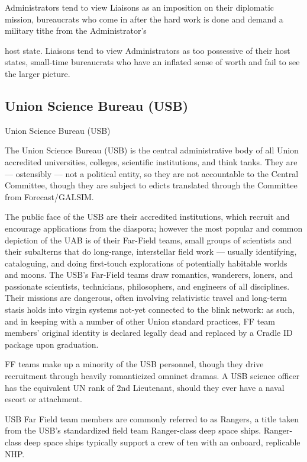 Administrators tend to view Liaisons as an imposition on their diplomatic mission, bureaucrats
who come in after the hard work is done and demand a military tithe from the Administrator’s




host state. Liaisons tend to view Administrators as too possessive of their host states, small-time
bureaucrats who have an inflated sense of worth and fail to see the larger picture.


\subsection{Union Science Bureau (USB)}

Union Science Bureau (USB)

The Union Science Bureau (USB) is the central administrative body of all Union accredited
universities, colleges, scientific institutions, and think tanks. They are — ostensibly — not a
political entity, so they are not accountable to the Central Committee, though they are subject to
edicts translated through the Committee from Forecast/GALSIM.


The public face of the USB are their accredited institutions, which recruit and encourage
applications from the diaspora; however the most popular and common depiction of the UAB is
of their Far-Field teams, small groups of scientists and their subalterns that do long-range,
interstellar field work — usually identifying, cataloguing, and doing first-touch explorations of
potentially habitable worlds and moons. The USB’s Far-Field teams draw romantics, wanderers,
loners, and passionate scientists, technicians, philosophers, and engineers of all disciplines.
Their missions are dangerous, often involving relativistic travel and long-term stasis holds into
virgin systems not-yet connected to the blink network: as such, and in keeping with a number of
other Union standard practices, FF team members’ original identity is declared legally dead and
replaced by a Cradle ID package upon graduation.


FF teams make up a minority of the USB personnel, though they drive recruitment through
heavily romanticized omninet dramas. A USB science officer has the equivalent UN rank of 2nd
Lieutenant, should they ever have a naval escort or attachment.


USB Far Field team members are commonly referred to as Rangers, a title taken from the USB’s
standardized field team Ranger-class deep space ships. Ranger-class deep space ships typically
support a crew of ten with an onboard, replicable NHP.


